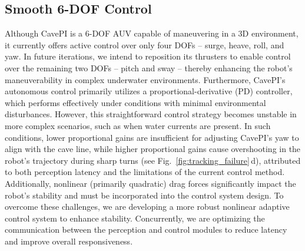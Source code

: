 \subsection{Smooth 6-DOF Control}

Although CavePI is a 6-DOF AUV capable of maneuvering in a 3D environment, it currently offers active control over only four DOFs -- surge, heave, roll, and yaw. In future iterations, we intend to reposition its thrusters to enable control over the remaining two DOFs -- pitch and sway -- thereby enhancing the robot’s maneuverability in complex underwater environments. Furthermore, CavePI's autonomous control primarily utilizes a proportional-derivative (PD) controller, which performs effectively under conditions with minimal environmental disturbances. However, this straightforward control strategy becomes unstable in more complex scenarios, such as when water currents are present. In such conditions, lower proportional gains are insufficient for adjusting CavePI’s yaw to align with the cave line, while higher proportional gains cause overshooting in the robot's trajectory during sharp turns (see Fig.~\ref{fig:tracking_failure}\,d), attributed to both perception latency and the limitations of the current control method. Additionally, nonlinear (primarily quadratic) drag forces significantly impact the robot's stability and must be incorporated into the control system design. To overcome these challenges, we are developing a more robust nonlinear adaptive control system to enhance stability. Concurrently, we are optimizing the communication between the perception and control modules to reduce latency and improve overall responsiveness.






